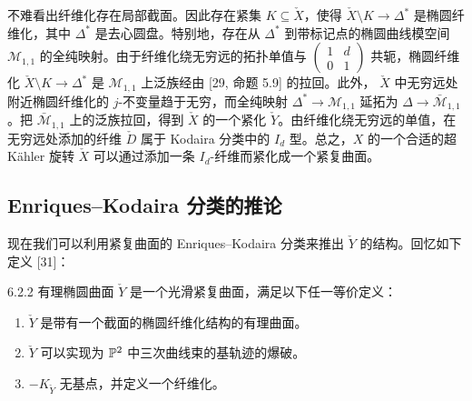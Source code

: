 不难看出纤维化存在局部截面。因此存在紧集 $K\subseteq\check X$，使得 $\check X\setminus K\to\Delta^*$ 是椭圆纤维化，其中 $\Delta^*$ 是去心圆盘。特别地，存在从 $\Delta^*$ 到带标记点的椭圆曲线模空间 $\mathcal{M}_{1,1}$ 的全纯映射。由于纤维化绕无穷远的拓扑单值与 $\begin{pmatrix}1&d\\0&1\end{pmatrix}$ 共轭，椭圆纤维化 $\check X\setminus K\to\Delta^*$ 是 $\mathcal{M}_{1,1}$ 上泛族经由 [29, 命题 5.9] 的拉回。此外，
$\check X$ 中无穷远处附近椭圆纤维化的 $j$-不变量趋于无穷，而全纯映射 $\Delta^*\to\mathcal{M}_{1,1}$ 延拓为 $\Delta\to\bar{\mathcal{M}}_{1,1}$。把 $\bar{\mathcal{M}}_{1,1}$ 上的泛族拉回，得到 $\check X$ 的一个紧化 $\check Y$。由纤维化绕无穷远的单值，在无穷远处添加的纤维 $\check D$ 属于 Kodaira 分类中的 $I_d$ 型。总之，$X$ 的一个合适的超 Kähler 旋转 $\check X$ 可以通过添加一条 $I_d$-纤维而紧化成一个紧复曲面。

\subsection{Enriques--Kodaira 分类的推论}
现在我们可以利用紧复曲面的 Enriques--Kodaira 分类来推出 $\check Y$ 的结构。回忆如下定义 [31]：

\begin{definition}{6.2.2}
有理椭圆曲面 $\check Y$ 是一个光滑紧复曲面，满足以下任一等价定义：
\begin{enumerate}
\item[(i)] $\check Y$ 是带有一个截面的椭圆纤维化结构的有理曲面。
\item[(ii)] $\check Y$ 可以实现为 $\mathbb{P}^2$ 中三次曲线束的基轨迹的爆破。
\item[(iii)] $-K_{\check Y}$ 无基点，并定义一个纤维化。
\end{enumerate}
\end{definition}

